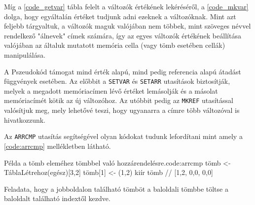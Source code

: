 
Míg a \ref{code_getvar} tábla felelt a változók értékének lekéréséről, a \ref{code_mkvar} dolga, hogy egyáltalán értéket tudjunk adni ezeknek a változóknak. Mint azt feljebb tárgyaltuk, a változók maguk valójában nem többek, mint szöveges névvel rendelkező "álnevek" címek számára, így az egyes változók értékének beállítása valójában az általuk mutatott memória cella (vagy tömb esetében cellák) manipulálása.

A Pszeudokód támogat mind érték alapú, mind pedig referencia alapú átadást függvények esetében. Az előbbit a \texttt{SETVAR} és \texttt{SETARR} utasítások biztosítják, melyek a megadott memóriacímen lévő értéket lemásolják és a másolat memóriacímét kötik az új változóhoz. Az utóbbit pedig az \texttt{MKREF} utasítással valósítjuk meg, mely lehetővé teszi, hogy ugyanarra a címre több változóval is hivatkozzunk.

Az \texttt{ARRCMP} utasítás segítségével olyan kódokat tudunk lefordítani mint amely a \ref{code:arrcmp} mellékletben látható.

\begin{code}{Példa a tömb eleméhez tömbbel való hozzárendelésre.}{code:arrcmp}
tömb <- TáblaLétrehoz(egész)[3,2]
tömb[1] <- (1,2)
kiír tömb // [1,2, 0,0, 0,0]
\end{code}

Feladata, hogy a jobboldalon található tömböt a baloldali tömbbe töltse a baloldalt található indextől kezdve.


